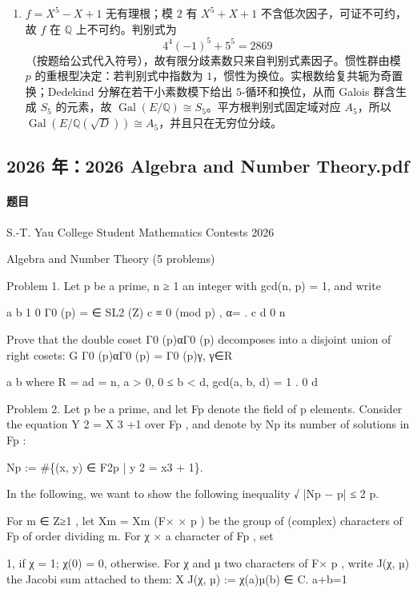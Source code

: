 \documentclass[UTF8,12pt]{ctexart}
\begin{document}
\begin{enumerate}[label=\textbf{\arabic*.},leftmargin=2.2em]
\[\mathcal O_E\otimes_{\mathcal O_F}M^\Gamma\simeq M.
\]
于是 \(\mathcal O_F\)-模范畴与带半线性 \(\Gamma\)-作用的 \(\mathcal O_E\)-模范畴等价。若 \(E/F\) 分歧，\(\mathcal O_E/\mathcal O_F\) 非 étale，第一步同构失败，例如不同嵌入模剩余域合并，故范畴等价不成立。
\item \(f=X^5-X+1\) 无有理根；模 \(2\) 有 \(X^5+X+1\) 不含低次因子，可证不可约，故 \(f\) 在 \(\mathbb Q\) 上不可约。判别式为
\[
4^4(-1)^5+5^5=2869
\]
（按题给公式代入符号），故有限分歧素数只来自判别式素因子。惯性群由模 \(p\) 的重根型决定：若判别式中指数为 \(1\)，惯性为换位。实根数给复共轭为奇置换；Dedekind 分解在若干小素数模下给出 \(5\)-循环和换位，从而 Galois 群含生成 \(S_5\) 的元素，故 \(\operatorname{Gal}(E/\mathbb Q)\cong S_5\)。平方根判别式固定域对应 \(A_5\)，所以 \(\operatorname{Gal}(E/\mathbb Q(\sqrt D))\cong A_5\)，并且只在无穷位分歧。
\end{enumerate}

\subsection{2026 年：2026 Algebra and Number Theory.pdf}
\paragraph{题目}
S.-T. Yau College Student Mathematics Contests 2026

Algebra and Number Theory (5 problems)

Problem 1. Let p be a prime, n ≥ 1 an integer with gcd(n, p) = 1, and write

a b 1 0 Γ0 (p) = ∈ SL2 (Z) c ≡ 0 (mod p) , α= . c d 0 n

Prove that the double coset Γ0 (p)αΓ0 (p) decomposes into a disjoint union of right cosets: G Γ0 (p)αΓ0 (p) = Γ0 (p)γ, γ∈R

a b where R = ad = n, a > 0, 0 ≤ b < d, gcd(a, b, d) = 1 . 0 d

Problem 2. Let p be a prime, and let Fp denote the field of p elements. Consider the equation Y 2 = X 3 +1 over Fp , and denote by Np its number of solutions in Fp :

Np := \#\{(x, y) ∈ F2p | y 2 = x3 + 1\}.

In the following, we want to show the following inequality √ |Np − p| ≤ 2 p.

For m ∈ Z≥1 , let Xm = Xm (F× × p ) be the group of (complex) characters of Fp of order dividing m. For χ × a character of Fp , set

1, if χ = 1; χ(0) = 0, otherwise. For χ and µ two characters of F× p , write J(χ, µ) the Jacobi sum attached to them: X J(χ, µ) := χ(a)µ(b) ∈ C. a+b=1
\end{document}

